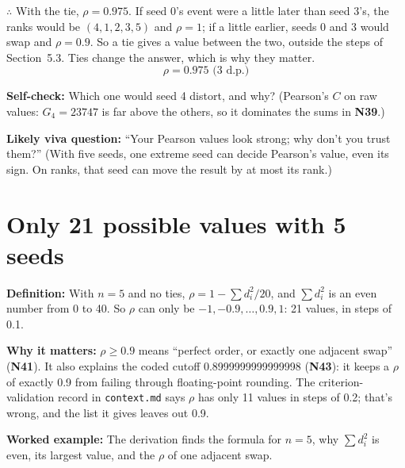 \documentclass[11pt,a4paper,oneside,openany]{report}
\newcommand{\code}[1]{\texttt{#1}}
\newcommand{\gl}[1]{\textbf{#1}}   %
\newcommand{\fdef}{\textbf{Definition:} }
\newcommand{\fwhy}{\par\textbf{Why it matters:} }
\newcommand{\fex}{\par\textbf{Worked example:} }
\newcommand{\fself}{\par\textbf{Self-check:} }
\newcommand{\fviva}{\par\textbf{Likely viva question:} }
\begin{document}
$\therefore$ With the tie, $\rho = 0.975$. If seed 0's event were a little later than seed 3's, the ranks would be $(4, 1, 2, 3, 5)$ and $\rho = 1$; if a little earlier, seeds 0 and 3 would swap and $\rho = 0.9$. So a tie gives a value between the two, outside the steps of Section~5.3. Ties change the answer, which is why they matter.
\[\boxed{\rho = 0.975 \text{ (3 d.p.)}}\]

\fself Which one would seed 4 distort, and why? (Pearson's $C$ on raw values: $G_4 = 23747$ is far above the others, so it dominates the sums in \gl{N39}.)
\fviva ``Your Pearson values look strong; why don't you trust them?'' (With five seeds, one extreme seed can decide Pearson's value, even its sign. On ranks, that seed can move the result by at most its rank.)

\section{Only 21 possible values with 5 seeds}
\fdef With $n = 5$ and no ties, $\rho = 1 - \sum d_i^2 / 20$, and $\sum d_i^2$ is an even number from 0 to 40. So $\rho$ can only be $-1, -0.9, \ldots, 0.9, 1$: 21 values, in steps of 0.1.
\fwhy $\rho \ge 0.9$ means ``perfect order, or exactly one adjacent swap'' (\gl{N41}). It also explains the coded cutoff 0.8999999999999998 (\gl{N43}): it keeps a $\rho$ of exactly 0.9 from failing through floating-point rounding. The criterion-validation record in \code{context.md} says $\rho$ has only 11 values in steps of 0.2; that's wrong, and the list it gives leaves out 0.9.
\fex The derivation finds the formula for $n = 5$, why $\sum d_i^2$ is even, its largest value, and the $\rho$ of one adjacent swap.
\end{document}
